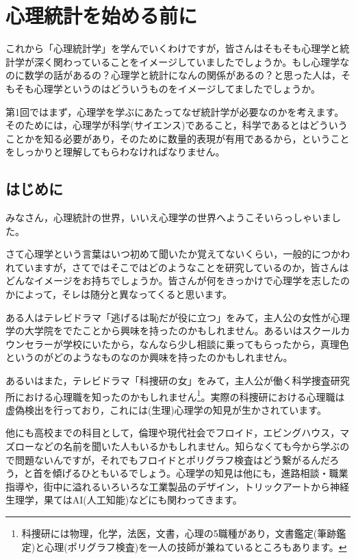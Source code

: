 \documentclass{ltjsbook}
\begin{document}
 
\chapter{心理統計を始める前に} 
\label{chapter1} 
これから「心理統計学」を学んでいくわけですが，皆さんはそもそも心理学と統計学が深く関わっていることをイメージしていましたでしょうか。もし心理学なのに数学の話があるの？心理学と統計になんの関係があるの？と思った人は，そもそも心理学というのはどういうものをイメージしてましたでしょうか。

第1回ではまず，心理学を学ぶにあたってなぜ統計学が必要なのかを考えます。そのためには，心理学が科学(サイエンス)であること，科学であるとはどういうことかを知る必要があり，そのために数量的表現が有用であるから，ということをしっかりと理解してもらわなければなりません。

\section{はじめに} 

みなさん，心理統計の世界，いいえ心理学の世界へようこそいらっしゃいました。

さて心理学という言葉はいつ初めて聞いたか覚えてないくらい，一般的につかわれていますが，さてではそこではどのようなことを研究しているのか，皆さんはどんなイメージをお持ちでしょうか。皆さんが何をきっかけで心理学を志したのかによって，そレは随分と異なってくると思います。

ある人はテレビドラマ「逃げるは恥だが役に立つ」をみて，主人公の女性が心理学の大学院をでたことから興味を持ったのかもしれません。あるいはスクールカウンセラーが学校にいたから，なんなら少し相談に乗ってもらったから，真理色というのがどのようなものなのか興味を持ったのかもしれません。

あるいはまた，テレビドラマ「科捜研の女」をみて，主人公が働く科学捜査研究所における心理職を知ったのかもしれません\footnote{科捜研には物理，化学，法医，文書，心理の5職種があり，文書鑑定(筆跡鑑定)と心理(ポリグラフ検査)を一人の技師が兼ねているところもあります。}。実際の科捜研における心理職は虚偽検出を行っており，これには(生理)心理学の知見が生かされています。

他にも高校までの科目として，倫理や現代社会でフロイド，エビングハウス，マズローなどの名前を聞いた人もいるかもしれません。知らなくても今から学ぶので問題ないんですが，それでもフロイドとポリグラフ検査はどう繋がるんだろう，と首を傾げるひともいるでしょう。心理学の知見は他にも，進路相談・職業指導や，街中に溢れるいろいろな工業製品のデザイン，トリックアートから神経生理学，果てはAI(人工知能)などにも関わってきます。
\end{document}
